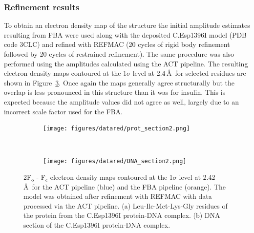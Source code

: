\subsubsection{Refinement results}
\label{subs:Refinement results - C.Esp1396I}
To obtain an electron density map of the structure the initial amplitude estimates resulting from FBA were used along with the deposited C.Esp1396I model (PDB code 3CLC) and refined with REFMAC \cite{murshudov2011refmac5} (20 cycles of rigid body refinement followed by 20 cycles of restrained refinement).
The same procedure was also performed using the amplitudes calculated using the ACT pipeline.
The resulting electron density maps contoured at the 1$\sigma$ level at 2.4$\,$\AA\ for selected residues are shown in Figure~\ref{fig:Electron density maps - C.Esp1396I}.
Once again the maps generally agree structurally but the overlap is less pronounced in this structure than it was for insulin.
This is expected because the amplitude values did not agree as well, largely due to an incorrect scale factor used for the FBA.
\begin{figure}
    \centering
    \begin{subfigure}[b]{1.0\textwidth}
            \centering
            \texttt{[image: figures/datared/prot\_section2.png]}
            \caption{}
            \label{fig:Electron density map 1 - C.Esp1396I}
    \end{subfigure}
    \\
    \begin{subfigure}[b]{1.0\textwidth}
            \centering
            \texttt{[image: figures/datared/DNA\_section2.png]}
            \caption{}
            \label{fig:Electron density map 2 - C.Esp1396I}
    \end{subfigure}
    \caption[2F$_{\text{o}}$ - F$_{\text{c}}$ electron density maps for the C.Esp1396I dataset]{2F$_{\text{o}}$ - F$_{\text{c}}$ electron density maps contoured at the 1$\sigma$ level at 2.42$\,$\AA\ for the ACT pipeline (blue) and the FBA pipeline (orange).
    The model was obtained after refinement with REFMAC with data processed via the ACT pipeline.
    (a) Leu-Ile-Met-Lys-Gly residues of the protein from the C.Esp1396I protein-DNA complex.
    (b) DNA section of the C.Esp1396I protein-DNA complex.}
    \label{fig:Electron density maps - C.Esp1396I}
\end{figure}


